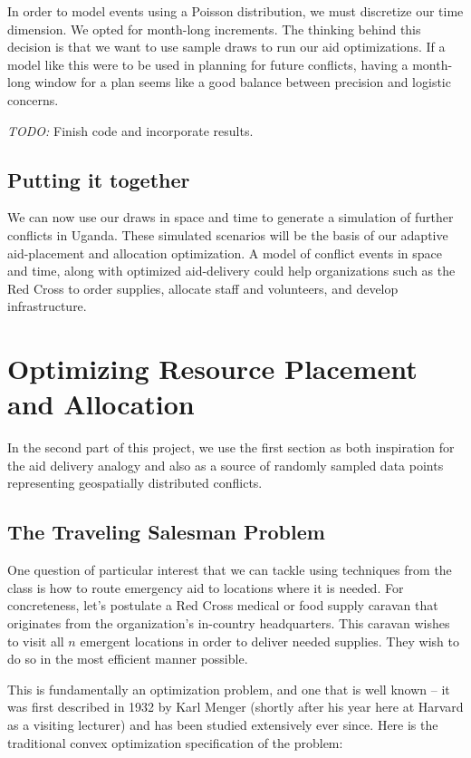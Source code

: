 \documentclass{article} %
\begin{document}
In order to model events using a Poisson distribution, we must discretize our time dimension. We opted for month-long increments. The thinking behind this decision is that we want to use sample draws to run our aid optimizations. If a model like this were to be used in planning for future conflicts, having a month-long window for a plan seems like a good balance between precision and logistic concerns.

\emph{TODO:} Finish code and incorporate results.

\subsection*{Putting it together}
We can now use our draws in space and time to generate a simulation of further conflicts in Uganda. These simulated scenarios will be the basis of our adaptive aid-placement and allocation optimization. A model of conflict events in space and time, along with optimized aid-delivery could help organizations such as the Red Cross to order supplies, allocate staff and volunteers, and develop infrastructure.

\section*{Optimizing Resource Placement and Allocation}

In the second part of this project, we use the first section as both inspiration for the aid delivery analogy and also as a source of randomly sampled data points representing geospatially distributed conflicts.

\subsection*{The Traveling Salesman Problem}

One question of particular interest that we can tackle using techniques from the class is how to route emergency aid
to locations where it is needed.  For concreteness, let's postulate a Red Cross medical or food supply caravan that originates
from the organization's in-country headquarters. This caravan wishes to visit all $n$ emergent locations in order to
deliver needed supplies. They wish to do so in the most efficient manner possible.

This is fundamentally an optimization problem, and one that is well known -- it was first described in 1932 by Karl Menger (shortly after his year here at Harvard as a visiting lecturer) and has been studied extensively ever since.\cite{Menger} Here is the traditional convex optimization specification of the problem:\cite{Winston}
\end{document}
